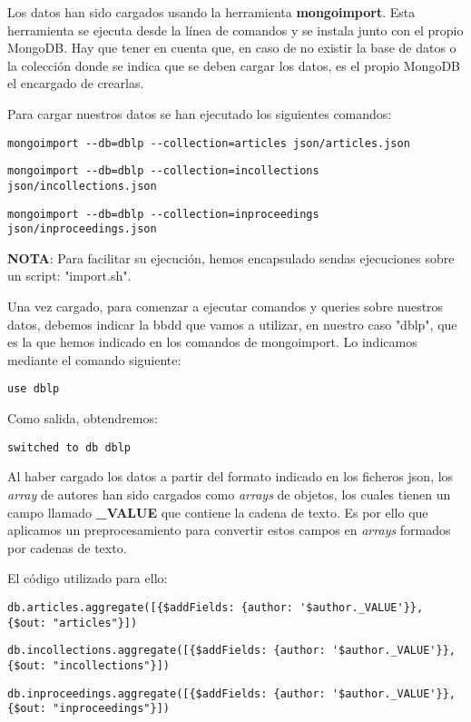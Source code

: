 Los datos han sido cargados usando la herramienta \textbf{mongoimport}. Esta herramienta se ejecuta desde la línea de comandos y se instala junto con el propio MongoDB. Hay que tener en cuenta que, en caso de no existir la base de datos o la colección donde se indica que se deben cargar los datos, es el propio MongoDB el encargado de crearlas.

Para cargar nuestros datos se han ejecutado los siguientes comandos:

\begin{verbatim}
mongoimport --db=dblp --collection=articles json/articles.json
\end{verbatim}

\begin{verbatim}
mongoimport --db=dblp --collection=incollections json/incollections.json
\end{verbatim}

\begin{verbatim}
mongoimport --db=dblp --collection=inproceedings json/inproceedings.json
\end{verbatim}

\textbf{NOTA}: Para facilitar su ejecución, hemos encapsulado sendas ejecuciones sobre un script: "import.sh".

Una vez cargado, para comenzar a ejecutar comandos y queries sobre nuestros datos, debemos indicar la bbdd que vamos a utilizar, en nuestro caso "dblp", que es la que hemos indicado en los comandos de mongoimport. Lo indicamos mediante el comando siguiente:

\begin{verbatim}
use dblp
\end{verbatim}

Como salida, obtendremos:

\begin{verbatim}
switched to db dblp
\end{verbatim}

Al haber cargado los datos a partir del formato indicado en los ficheros json, los \textit{array} de autores han sido cargados como \textit{arrays} de objetos, los cuales tienen un campo llamado \textbf{\_VALUE} que contiene la cadena de texto. Es por ello que aplicamos un preprocesamiento para convertir estos campos en \textit{arrays} formados por cadenas de texto.

El código utilizado para ello:

\begin{verbatim}
db.articles.aggregate([{$addFields: {author: '$author._VALUE'}}, {$out: "articles"}])
\end{verbatim}
\begin{verbatim}
db.incollections.aggregate([{$addFields: {author: '$author._VALUE'}}, {$out: "incollections"}])
\end{verbatim}
\begin{verbatim}
db.inproceedings.aggregate([{$addFields: {author: '$author._VALUE'}}, {$out: "inproceedings"}])
\end{verbatim}

